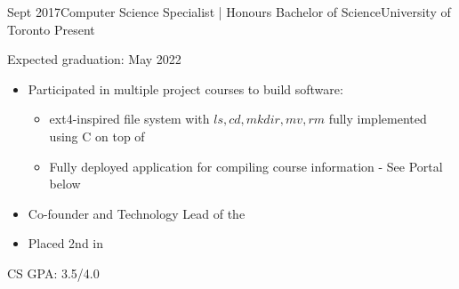 %
%
%


\begin{experiences}
  \university
    {Sept 2017}{Computer Science Specialist | Honours Bachelor of Science}{University of Toronto}
    {Present} {
                      Expected graduation: May 2022
                      \begin{itemize}
                        \item Participated in multiple project courses to build software:
                          \begin{itemize}
                            \item{ext4-inspired file system with $ls,cd,mkdir,mv,rm$ fully implemented using C on top of }
                            \item{Fully deployed application for compiling course information - See Portal below}
                          \end{itemize}         
                        \item Co-founder and Technology Lead of the            
                        \item Placed 2nd in                                                                 
                      \end{itemize}
                    }
                    {CS GPA: 3.5/4.0}
\end{experiences}
